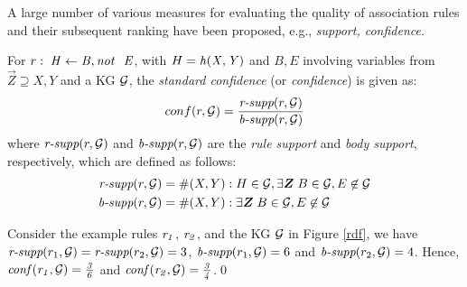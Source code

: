 A large number of various measures for evaluating the quality of association rules and their subsequent ranking have been proposed, e.g., \emph{support, confidence}. %

For $r:\;\mi{H\leftarrow B, \naf\ E}$, with $H=\mathit{h(X,Y)}$ and $B,E$ involving variables from $\vec{Z}\supseteq X,Y$ and a KG $\mathcal{G}$, the \emph{standard confidence} (or \textit{confidence}) is given as:\vspace{-.26cm}
\begin{align*}
conf(r,\mathcal{G})= \frac{\textit{r-supp}(r,\mathcal{G})}{\textit{b-supp}(r,\mathcal{G})}
\end{align*}
where $\textit{r-supp}(r,\mathcal{G})$ and $\textit{b-supp}(r ,\mathcal{G})$ are the \textit{rule support} and \textit{body support}, respectively, which are defined as follows:
\begin{align*}
\textit{r-supp}(r,\cG) &= \#(X,Y): H \in \cG, \exists \vec{Z}\;B\in \cG,E \not \in \cG\\
\textit{b-supp}(r,\cG) &= \#(X,Y):\exists \vec{Z}\; B\in \cG, E \not \in \cG
\end{align*}
\begin{example}
Consider the example rules $\mathit{r_1}$, $\mathit{r_2}$, and the KG $\mathcal{G}$ in Figure \ref{rdf}, we have $\textit{r-supp}(r_1,\mathcal{G}) = \textit{r-supp}(r_2,\mathcal{G}) = 3$, $\textit{b-supp}(r_1,\mathcal{G}) = 6$ and $\textit{b-supp}(r_2,\mathcal{G}) = 4$.
Hence, $\mathit{conf(r_1,\mathcal{G}) = \frac{3}{6}}$ and $\mathit{conf(r_2,\mathcal{G}) = \frac{3}{4}}$.\qed
\end{example}

